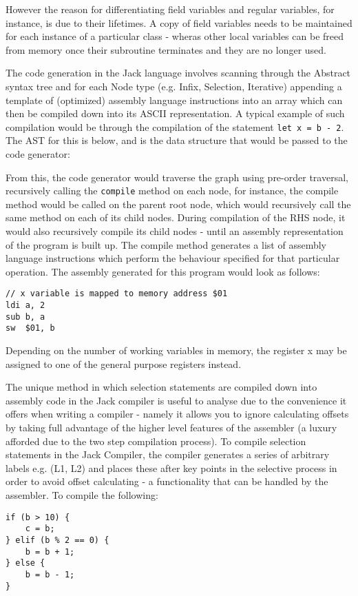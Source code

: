 However the reason for differentiating field variables and regular variables, for instance, is due to their lifetimes. A copy of field variables needs to be maintained for each instance of a particular class - wheras other local variables can be freed from memory once their subroutine terminates and they are no longer used.

The code generation in the Jack language involves scanning through the Abstract syntax tree and for each Node type (e.g. Infix, Selection, Iterative) appending a template of (optimized) assembly language instructions into an array which can then be compiled down into its ASCII representation. A typical example of such compilation would be through the compilation of the statement \texttt{let x = b - 2}. The AST for this is below, and is the data structure that would be passed to the code generator:

\bigskip


\bigskip

From this, the code generator would traverse the graph using pre-order traversal, recursively calling the \texttt{compile} method on each node, for instance, the compile method would be called on the parent root node, which would recursively call the same method on each of its child nodes. During compilation of the RHS node, it would also recursively compile its child nodes - until an assembly representation of the program is built up. The compile method generates a list of assembly language instructions which perform the behaviour specified for that particular operation. The assembly generated for this program would look as follows:
\begin{lstlisting}
// x variable is mapped to memory address $01 
ldi a, 2
sub b, a 
sw  $01, b
\end{lstlisting}
Depending on the number of working variables in memory, the register x may be assigned to one of the general purpose registers instead.

The unique method in which selection statements are compiled down into assembly code in the Jack compiler is useful to analyse due to the convenience it offers when writing a compiler - namely it allows you to ignore calculating offsets by taking full advantage of the higher level features of the assembler (a luxury afforded due to the two step compilation process). To compile selection statements in the Jack Compiler, the compiler generates a series of arbitrary labels e.g. (L1, L2) and places these after key points in the selective process in order to avoid offset calculating - a functionality that can be handled by the assembler. To compile the following:
\begin{lstlisting}
if (b > 10) {
    c = b;
} elif (b % 2 == 0) {
    b = b + 1; 
} else {
    b = b - 1;
}
\end{lstlisting}

